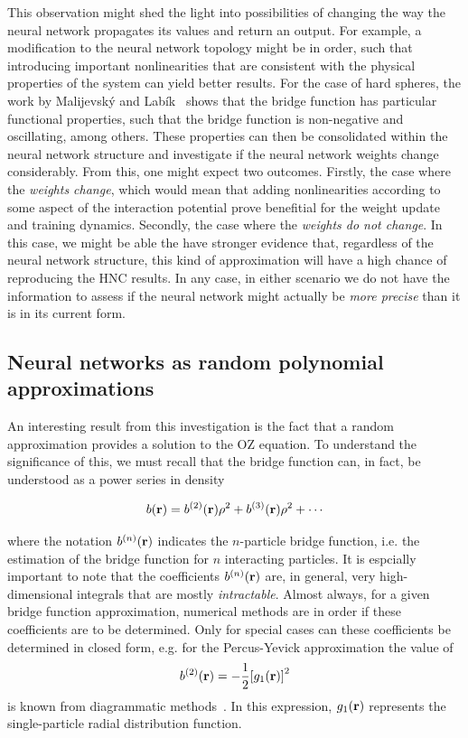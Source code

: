 This observation might shed the light into possibilities of changing the way the neural
network propagates its values and return an output. For example, a modification to the
neural network topology might be in order, such that introducing important 
nonlinearities that are consistent with the physical properties of the system can yield
better results. For the case of hard spheres, the work by Malijevský and Labík~\cite{malijevskyBridgeFunctionHard1987}
shows that the bridge function has particular functional properties, such that the
bridge function is non-negative and oscillating, among others. These properties can then
be consolidated within the neural network structure and investigate if the neural network 
weights change considerably.
From this, one might expect two outcomes. Firstly, the case where the \emph{weights change},
which would mean that adding nonlinearities according to some aspect of the interaction 
potential prove benefitial for the weight update and training dynamics.
Secondly, the case where the \emph{weights do not change}. In this case, we might
be able the have stronger evidence that, regardless of the neural network structure,
this kind of approximation will have a high chance of reproducing the HNC results.
In any case, in either scenario we do not have the information to assess if the neural
network might actually be \emph{more precise} than it is in its current form.

\subsection{Neural networks as random polynomial approximations}
An interesting result from this investigation is the fact that a random approximation
provides a solution to the OZ equation. To understand the significance of this,
we must recall that the bridge function can, in fact, be understood as a
power series in density~\cite{hansenTheorySimpleLiquids2013}

\begin{equation}
    b(\vecr) = b^{(2)}(\vecr) \rho^2 + b^{(3)}(\vecr) \rho^2 + \cdots
    \label{eq:expansion-densidad}
\end{equation}

where the notation $b^{(n)}(\mathbf{r})$ indicates the $n$-particle bridge function, i.e. the
estimation of the bridge function for $n$ interacting particles. It is espcially
important to note that the coefficients $b^{(n)}(\mathbf{r})$ are, in general, very high-dimensional
integrals that are mostly \emph{intractable}. Almost always, for a given bridge function
approximation, numerical methods are in order if these coefficients are to be determined.
Only for special cases can these coefficients be determined in closed form, e.g.
for the Percus-Yevick approximation the value of 
\[
b^{(2)}(\mathbf{r}) = -\frac{1}{2}{\left[ g_{1}(\mathbf{r}) \right]}^2
\]
is known from diagrammatic methods~\cite{hansenTheorySimpleLiquids2013}. In this
expression, $g_{1}(\mathbf{r})$ represents the single-particle radial distribution function.

